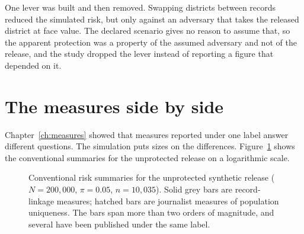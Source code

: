 One lever was built and then removed. Swapping districts between records reduced
the simulated risk, but only against an adversary that takes the released district
at face value. The declared scenario gives no reason to assume that, so the
apparent protection was a property of the assumed adversary and not of the
release, and the study dropped the lever instead of reporting a figure that
depended on it.

\section{The measures side by side}

Chapter~\ref{ch:measures} showed that measures reported under one label answer
different questions. The simulation puts sizes on the differences.
Figure~\ref{c11:fig-measures} shows the conventional summaries for the unprotected
release on a logarithmic scale.

\begin{figure}[ht]
\centering
{}
\caption{Conventional risk summaries for the unprotected synthetic release
($N = 200{,}000$, $\pi = 0.05$, $n = 10{,}035$). Solid grey bars are
record-linkage measures; hatched bars are journalist measures of population
uniqueness. The bars span more than two orders of magnitude, and several have been
published under the same label.}
\label{c11:fig-measures}
\end{figure}

